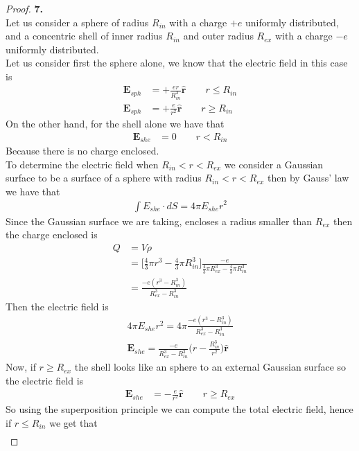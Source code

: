 \documentclass[11pt]{article}
\newcommand{\hatr}{\bm{\hat{r}}}
\theoremstyle{definition}
\begin{document}
\begin{proof}{\textbf{7.}}\\
Let us consider a sphere of radius $R_{in}$ with a charge $+e$ uniformly
distributed, and a concentric shell of inner radius $R_{in}$ and outer radius
$R_{ex}$ with a charge $-e$ uniformly distributed.
\\
Let us consider first the sphere alone, we know that the electric field in this
case is
\begin{align*}
    \bm{E}_{sph} &= +\frac{er}{R_{in}^3} \hatr \qquad r \leq R_{in}\\
    \bm{E}_{sph} &= +\frac{e}{r^2} \hatr \qquad r \geq R_{in}
\end{align*}
On the other hand, for the shell alone we have that
\begin{align*}
    \bm{E}_{she} &= 0 \qquad r < R_{in}
\end{align*}
Because there is no charge enclosed.
\\
To determine the electric field when $R_{in} < r < R_{ex}$ we consider a
Gaussian surface to be a surface of a sphere with radius 
$R_{in} < r < R_{ex}$ then by Gauss' law we have that
\begin{align*}
    \int E_{she}\cdot dS = 4\pi E_{she} r^2
\end{align*}
Since the Gaussian surface we are taking, encloses a radius smaller than
$R_{ex}$ then the charge enclosed is
\begin{align*}
    Q &= V \rho\\
    &= \bigg[\frac{4}{3}\pi r^3 - \frac{4}{3}\pi R_{in}^3\bigg]
    \frac{-e}{\frac{4}{3}\pi R_{ex}^3 - \frac{4}{3}\pi R_{in}^3}\\
    &= \frac{-e(r^3 - R_{in}^3)}{R_{ex}^3 - R_{in}^3}
\end{align*}
Then the electric field is
\begin{align*}
    4\pi E_{she} r^2 = 4\pi\frac{-e(r^3 - R_{in}^3)}{R_{ex}^3 - R_{in}^3}\\
    \bm{E}_{she} = \frac{-e}{R_{ex}^3 - R_{in}^3}\bigg(r - \frac{R_{in}^3}{r^2}\bigg)\hatr
\end{align*}
Now, if $r \geq R_{ex}$ the shell looks like an sphere to an external Gaussian
surface so the electric field is
\begin{align*}
    \bm{E}_{she} &= -\frac{e}{r^2} \hatr \qquad r \geq R_{ex}
\end{align*}
So using the superposition principle we can compute the total electric field,
hence if $r \leq R_{in}$ we get that
\begin{align*}

\end{align*}
\end{proof}
\end{document}
